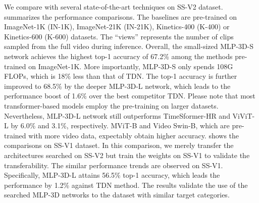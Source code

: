 \documentclass[10pt,twocolumn,letterpaper]{article}
\begin{document}
We compare with several state-of-the-art techniques on SS-V2 dataset.  summarizes the performance comparisons. The baselines are pre-trained on ImageNet-1K (IN-1K), ImageNet-21K (IN-21K), Kinetics-400 (K-400) or Kinetics-600 (K-600) datasets. The ``views'' represents the number of clips sampled from the full video during inference. Overall, the small-sized MLP-3D-S network achieves the highest top-1 accuracy of 67.2\% among the methods pre-trained on ImageNet-1K. More importantly, MLP-3D-S only spends 108G FLOPs, which is 18\% less than that of TDN. The top-1 accuracy is further improved to 68.5\% by the deeper MLP-3D-L network, which leads to the performance boost of 1.6\% over the best competitor TDN. Please note that most transformer-based models employ the pre-training on larger datasets. Nevertheless, MLP-3D-L network still outperforms TimeSformer-HR and ViViT-L by 6.0\% and 3.1\%, respectively. MViT-B and Video Swin-B, which are pre-trained with more video data, expectably obtain higher accuracy.  shows the comparisons on SS-V1 dataset. In this comparison, we merely transfer the architectures searched on SS-V2 but train the weights on SS-V1 to validate the transferability. The similar performance trends are observed on SS-V1. Specifically, MLP-3D-L attains 56.5\% top-1 accuracy, which leads the performance by 1.2\% against TDN method. The results validate the use of the searched MLP-3D networks to the dataset with similar target categories.
\end{document}
